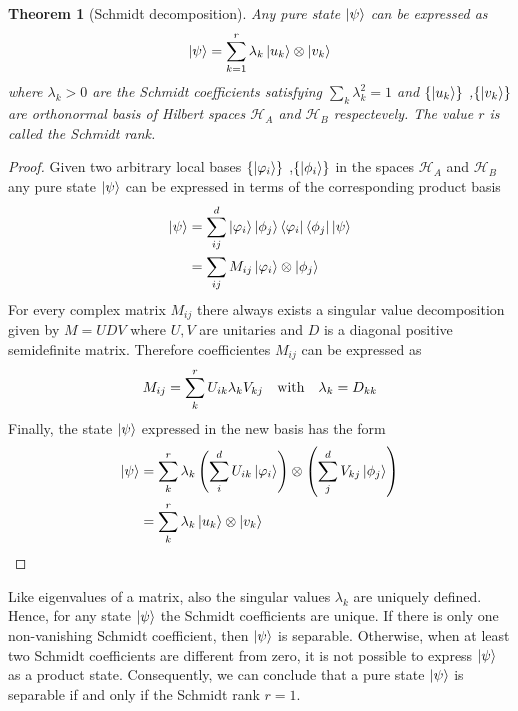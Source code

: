 \documentclass[10pt,a4paper]{book}
\numberwithin{equation}{chapter}
\numberwithin{figure}{chapter}
\numberwithin{table}{chapter}
\newtheorem{theorem}{Theorem}[section]
\begin{document}
\begin{theorem}[Schmidt decomposition] Any pure state $\ket{\psi}$ can be expressed as
\begin{equation}
\ket{\psi}=\sum^{r}_{k=1} \lambda_k \ket{u_k}\otimes \ket{v_k}
\end{equation}
where $\lambda_k > 0$ are the Schmidt coefficients satisfying $\sum_k \lambda^{2}_k =1$ and $\lbrace \ket{u_k} \rbrace$ ,$\lbrace \ket{v_k} \rbrace $ are orthonormal basis of Hilbert spaces $\mathcal{H}_A$ and $\mathcal{H}_B$ respectevely. The value $r$ is called the Schmidt rank. 
\label{theo:schmidt}
\end{theorem}
\begin{proof}
Given two arbitrary local bases $\lbrace \ket{\varphi_i}\rbrace$ ,$\lbrace \ket{\phi_i} \rbrace $ in the spaces $\mathcal{H}_A$ and $\mathcal{H}_B$ any pure state $\ket{\psi}$ can be expressed in terms of the corresponding product basis
\begin{align}
\ket{\psi}&=\sum^{d}_{ij} \ket{\varphi_i}\ket{\phi_j} \bra{\varphi_i} \bra{\phi_j} \ket{\psi} \\
&= \sum_{ij} M_{ij} \ket{\varphi_i}\otimes \ket{\phi_j}
\end{align}
For every complex matrix $M_{ij}$ there always exists a singular value decomposition given by $M=UDV$ where $U,V$ are unitaries and $D$ is a diagonal positive semidefinite matrix. Therefore coefficientes $M_{ij}$ can be expressed as
\begin{equation}
M_{ij}= \sum^{r}_k U_{ik} \lambda_k V_{kj} \quad \textup{with} \quad \lambda_k = D_{kk}
\end{equation}
Finally, the state $\ket{\psi}$ expressed in the new basis has the form
\begin{align}
\ket{\psi}&= \sum^{r}_k \lambda_k \left( \sum^{d}_i U_{ik} \ket{\varphi_i}\right) \otimes \left( \sum^{d}_j V_{kj} \ket{\phi_j}\right)\\
&=  \sum^{r}_k \lambda_k \ket{u_k}\otimes \ket{v_k}
\end{align}
\end{proof}

Like eigenvalues of a matrix, also the singular values $\lambda_k$ are uniquely defined. Hence, for any state $\ket{\psi}$ the Schmidt coefficients are unique. If there is only one non-vanishing Schmidt
coefficient, then $\ket{\psi}$ is separable. Otherwise, when at least two Schmidt coefficients are different from zero, it is not possible to express $\ket{\psi}$ as a product state. Consequently, we can conclude that a pure state $\ket{\psi}$ is separable if and only if the Schmidt rank $r=1$.
\end{document}

